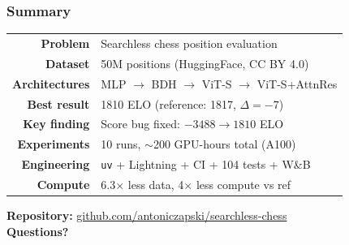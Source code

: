 \documentclass{beamer}
\begin{document}
\begin{frame}
\frametitle{Summary}

\begin{center}
\large
\begin{tabular}{rl}
\textbf{Problem}      & Searchless chess position evaluation \\[0.4em]
\textbf{Dataset}      & 50M positions (HuggingFace, CC BY 4.0) \\[0.4em]
\textbf{Architectures}& MLP $\to$ BDH $\to$ ViT-S $\to$ \alert{ViT-S+AttnRes} \\[0.4em]
\textbf{Best result}  & \alert{1810 ELO} (reference: 1817, $\Delta = -7$) \\[0.4em]
\textbf{Key finding}  & Score bug fixed: $-3488 \to 1810$ ELO \\[0.4em]
\textbf{Experiments}  & 10 runs, $\sim$200 GPU-hours total (A100) \\[0.4em]
\textbf{Engineering}  & \texttt{uv} + Lightning + CI + 104 tests + W\&B \\[0.4em]
\textbf{Compute}      & 6.3$\times$ less data, 4$\times$ less compute vs ref \\
\end{tabular}
\end{center}

\vspace{1em}
\begin{center}
\large
\textbf{Repository:} \url{github.com/antoniczapski/searchless-chess}\\[0.5em]
\Large \textbf{Questions?}
\end{center}

\end{frame}
\end{document}
